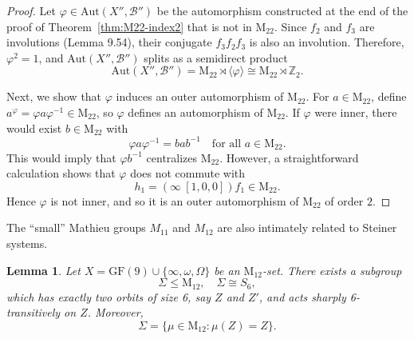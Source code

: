 \documentclass[12pt,a4paper,openany]{book}
\newtheorem{lemma}{Lemma}[section]
\newcommand{\GF}{\mathrm{GF}}
\newcommand{\Aut}{\mathrm{Aut}}
\newcommand{\Mtwelve}{M_{12}}
\newcommand{\Meleven}{M_{11}}
\begin{document}
\begin{proof}
Let $\varphi \in \Aut(X'', \mathscr{B}'')$ be the automorphism constructed at the end of the proof of Theorem~\ref{thm:M22-index2} that is not in $\mathrm{M}_{22}$. Since $f_2$ and $f_3$ are involutions (Lemma 9.54), their conjugate $f_3 f_2 f_3$ is also an involution. Therefore, $\varphi^2 = 1$, and $\Aut(X'', \mathscr{B}'')$ splits as a semidirect product
\[
\Aut(X'', \mathscr{B}'') = \mathrm{M}_{22} \rtimes \langle \varphi \rangle \cong \mathrm{M}_{22} \rtimes \mathbb{Z}_2.
\]

Next, we show that $\varphi$ induces an outer automorphism of $\mathrm{M}_{22}$. For $a \in \mathrm{M}_{22}$, define $a^\varphi = \varphi a \varphi^{-1} \in \mathrm{M}_{22}$, so $\varphi$ defines an automorphism of $\mathrm{M}_{22}$. If $\varphi$ were inner, there would exist $b \in \mathrm{M}_{22}$ with
\[
\varphi a \varphi^{-1} = b a b^{-1} \quad \text{for all } a \in \mathrm{M}_{22}.
\]
This would imply that $\varphi b^{-1}$ centralizes $\mathrm{M}_{22}$. However, a straightforward calculation shows that $\varphi$ does not commute with 
\[
h_1 = (\infty\ [1,0,0]) f_1 \in \mathrm{M}_{22}.
\]
Hence $\varphi$ is not inner, and so it is an outer automorphism of $\mathrm{M}_{22}$ of order $2$.
\end{proof}


The ``small'' Mathieu groups $\Meleven$ and $\Mtwelve$ are also intimately related to Steiner systems.

\begin{lemma}\label{lem:S6-in-M12}
Let $X = \GF(9) \cup \{\infty, \omega, \Omega\}$ be an $\mathrm{M}_{12}$-set. There exists a subgroup 
\[
\Sigma \leq \mathrm{M}_{12}, \quad \Sigma \cong S_6,
\]
which has exactly two orbits of size 6, say $Z$ and $Z'$, and acts sharply 6-transitively on $Z$. Moreover,
\[
\Sigma = \{\mu \in \mathrm{M}_{12} : \mu(Z) = Z\}.
\]
\end{lemma}
\end{document}
